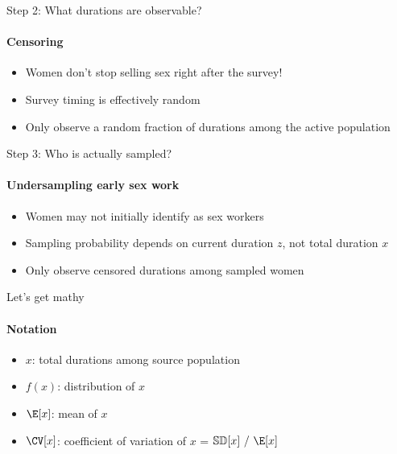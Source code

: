 \begin{frame}[t]{Step 2: What durations are observable?}
  \paragraph{Censoring}
  \begin{itemize}
    \item Women don't stop selling sex right after the survey!
    \item Survey timing is effectively random
    \item Only observe a random fraction of durations among the active population 
  \end{itemize}
\end{frame}
\begin{frame}[t]{Step 3: Who is actually sampled?}
  \paragraph{Undersampling early sex work}
  \begin{itemize}
    \item Women may not initially identify as sex workers \cite{Cheuk2020}
    \item Sampling probability depends on current duration $z$, not total duration $x$
    \item Only observe censored durations among sampled women 
  \end{itemize}
\end{frame}
\begin{frame}[t]{Let's get mathy}
  \paragraph{Notation}
  \begin{itemize}
    \item $x$: total durations among source population
    \item $f(x)$: distribution of $x$
    \item $\E[x]$: mean of $x$
    \item $\CV[x]$: coefficient of variation of $x$ = $\mathbb{SD}[x]~/~\E[x]$
  \end{itemize}
\end{frame}
